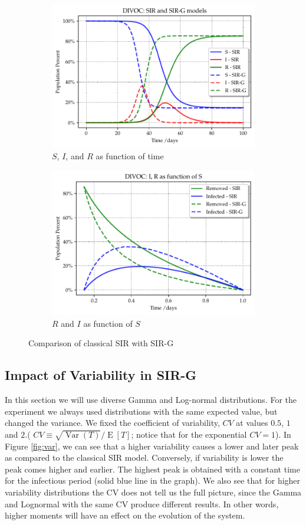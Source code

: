 \documentclass[USenglish,10pt]{article}
\DeclareMathOperator{\Exp}{E}       %
\newcommand{\E}[1]{\Exp\left[{#1}\right]}       %
\DeclareMathOperator{\Var}{Var}   %
\begin{document}
\begin{figure}
	\centering
	\begin{subfigure}{.45\textwidth}
		\includegraphics[width=.8\linewidth]{DIVOC-SIR-comp.pdf}
		\caption{$S$, $I$, and $R$ as function of time}
	\end{subfigure}
	\begin{subfigure}{.45\textwidth}
		\includegraphics[width=.8\linewidth]{DIVOC-IR-comp.pdf}
		\caption{$R$ and $I$ as function of $S$}
	\end{subfigure}
	\caption{Comparison of classical SIR with SIR-G}
	\label{fig:comp}
\end{figure}


\subsection{Impact of Variability in SIR-G}

In this section we will use diverse Gamma and Log-normal distributions. For the experiment we always used distributions with the same expected value, but changed the variance.
We fixed the coefficient of variability, $CV$ at values $0.5$, $1$ and $2$.( $CV \equiv \sqrt{\Var{(T)}}/\E{T}$; notice that for the exponential $CV=1$).
In Figure \ref{fig:var}, we can see that a higher variability causes a lower and later peak as compared to the classical SIR model.
Conversely, if variability is lower the peak comes higher and earlier. The highest peak is obtained with a constant time for the infectious period (solid blue line in the graph).
We also see that for higher variability distributions the CV does not tell us the full picture, since the Gamma and Lognormal with the same CV produce different results. In other words, higher moments will have an effect on the evolution of the system.
\end{document}
